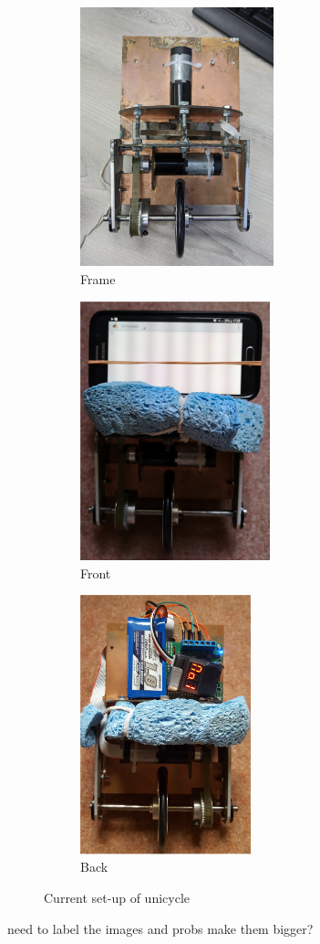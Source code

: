 \documentclass[twoside,twocolumn,12pt]{article}
\begin{document}
\begin{figure}[t!]
  \centering
  \begin{subfigure}[t]{0.325\textwidth}
    \includegraphics[width=\linewidth,height=7.5cm]{uni_old_mech}
   \caption{Frame}
  \label{sub:frameold}
  \end{subfigure}
  \begin{subfigure}[t]{0.325\textwidth}
    \includegraphics[width=\linewidth,height=7.5cm]{old1}
    \caption{Front \cite{arsalan}}
  \label{sub:frontold}
  \end{subfigure}
  \begin{subfigure}[t]{0.325\textwidth}
    \includegraphics[width=\linewidth,height=7.5cm]{old2}
    \caption{Back \cite{arsalan}}
  \label{sub:backold}
  \end{subfigure}
  \caption{Current set-up of unicycle}
  \label{fig:current}
\end{figure}
need to label the images and probs make them bigger?
\end{document}
